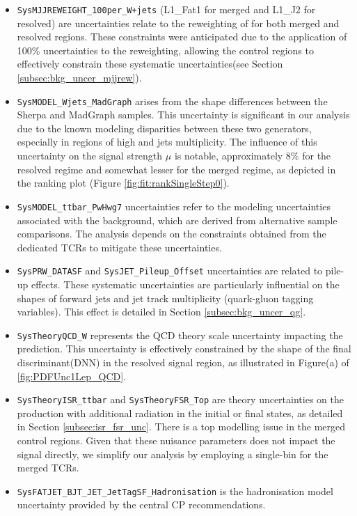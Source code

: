 \begin{itemize}
       \item \texttt{SysMJJREWEIGHT\_100per\_W+jets} (L1\_Fat1 for merged and L1\_J2 for resolved)
       are uncertainties relate to the reweighting of \mjjtag for both merged and resolved regions. 
       These constraints were anticipated due to the application of 100\% uncertainties to the \mjjtag reweighting, 
       allowing the control regions to effectively constrain these systematic uncertainties(see Section \ref{subsec:bkg_uncer_mjjrew}).

       \item \texttt{SysMODEL\_Wjets\_MadGraph}
       arises from the shape differences between the Sherpa and MadGraph samples. 
       This uncertainty is significant in our analysis due to the known modeling disparities between these two generators, 
       especially in regions of high \mjjtag and jets multiplicity. The influence of this uncertainty on the signal strength $\mu$ is notable, 
       approximately $8\%$ for the resolved regime and somewhat lesser for the merged regime, 
       as depicted in the ranking plot (Figure \ref{fig:fit:rankSingleStep0}).

       \item \texttt{SysMODEL\_ttbar\_PwHwg7}
       uncertainties refer to the modeling uncertainties associated with the \ttbar background, 
       which are derived from alternative sample comparisons. 
       The analysis depends on the constraints obtained from the dedicated TCRs to mitigate these uncertainties.

       \item \texttt{SysPRW\_DATASF} and \texttt{SysJET\_Pileup\_Offset} uncertainties are related to pile-up effects. 
       These systematic uncertainties are particularly influential on the shapes of forward jets and jet track multiplicity 
       (quark-gluon tagging variables). This effect is detailed in Section \ref{subsec:bkg_uncer_qg}.

       \item \texttt{SysTheoryQCD\_W} represents the QCD theory scale uncertainty impacting the \Wjets prediction. 
       This uncertainty is effectively constrained by the shape of the final discriminant(DNN) in the resolved signal region, 
       as illustrated in Figure(a) of \ref{fig:PDFUnc1Lep_QCD}.

       \item \texttt{SysTheoryISR\_ttbar} and \texttt{SysTheoryFSR\_Top} are theory uncertainties on the \ttbar production
       with additional radiation in the initial or final states, as detailed in Section \ref{subsec:isr_fsr_unc}. 
       There is a top modelling issue in the merged control regions. Given that these nuisance parameters does not impact the signal directly, 
       we simplify our analysis by employing a single-bin for the merged TCRs.

       \item \texttt{SysFATJET\_BJT\_JET\_JetTagSF\_Hadronisation} is the hadronisation model uncertainty
       provided by the central CP recommendations.

\end{itemize}


